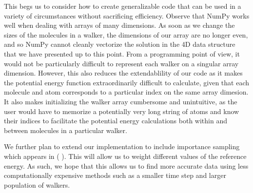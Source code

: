 \documentclass[journal=jacsat,manuscript=article]{achemso}
\begin{document}
This begs us to consider how to create generalizable code that can be used in a variety of circumstances without sacrificing efficiency. Observe that NumPy works well when dealing with arrays of many dimensions. As soon as we change the sizes of the molecules in a walker, the dimensions of our array are no longer even, and so NumPy cannot cleanly vectorize the solution in the 4D data structure that we have presented up to this point. From a programming point of view, it would not be particularly difficult to represent each walker on a singular array dimension. However, this also reduces the extendablility of our code as it makes the potential energy function extraordinarily difficult to calculate, given that each molecule and atom corresponds to a particular index on the same array dimesion. It also makes initializing the walker array cumbersome and unintuitive, as the user would have to memorize a potentially very long string of atoms and know their indices to facilitate the potential energy calculations both within and between molecules in a particular walker. 

We further plan to extend our implementation to include importance sampling which appears in ( ). This will allow us to weight different values of the reference energy. As such, we hope that this allows us to find more accurate data using less computationally expensive methods such as a smaller time step and larger population of walkers. 
\end{document}
